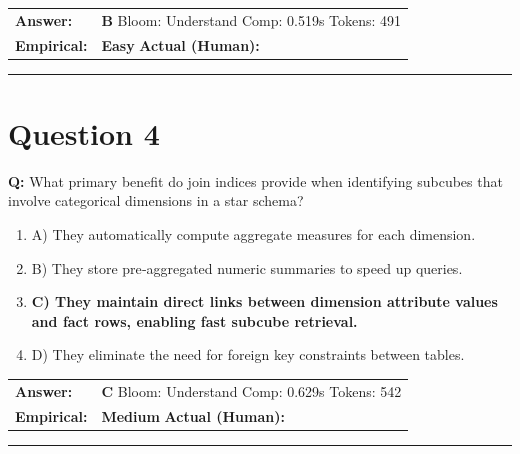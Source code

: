 \documentclass[9pt]{article}
\begin{document}
\begin{tabular}{@{}l p{10.5cm}@{}}
\textbf{Answer:} & \textbf{B} \hspace{1em} Bloom: Understand \hspace{1em} Comp: 0.519s \hspace{1em} Tokens: 491 \\
\textbf{Empirical:} & \textbf{Easy} \hspace{1em} \textbf{Actual (Human):} \underline{\hspace{5cm}}
\end{tabular}

\vspace{0.2cm}
\rule{\textwidth}{0.4pt}
\vspace{0.2cm}


\section*{Question 4}

\textbf{Q:} What primary benefit do join indices provide when identifying subcubes that involve categorical dimensions in a star schema?

\begin{enumerate}[label=\textbf{\alph{*})}, nosep]
    \item A) They automatically compute aggregate measures for each dimension.
    \item B) They store pre‑aggregated numeric summaries to speed up queries.
    \item \textbf{C) They maintain direct links between dimension attribute values and fact rows, enabling fast subcube retrieval.} %
    \item D) They eliminate the need for foreign key constraints between tables.

\end{enumerate}

\begin{tabular}{@{}l p{10.5cm}@{}}
\textbf{Answer:} & \textbf{C} \hspace{1em} Bloom: Understand \hspace{1em} Comp: 0.629s \hspace{1em} Tokens: 542 \\
\textbf{Empirical:} & \textbf{Medium} \hspace{1em} \textbf{Actual (Human):} \underline{\hspace{5cm}}
\end{tabular}

\vspace{0.2cm}
\rule{\textwidth}{0.4pt}
\vspace{0.2cm}
\end{document}
